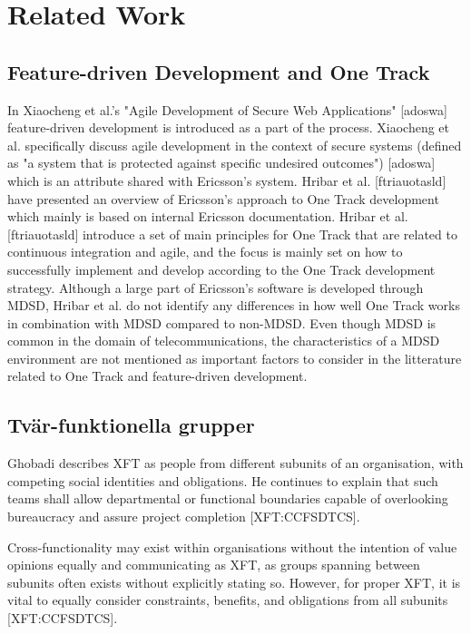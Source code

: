 \documentclass[fina_report_innit.tex]{subfiles}
\begin{document}
\section{Related Work}


\subsection*{Feature-driven Development and One Track}
In Xiaocheng et al.'s "Agile Development of Secure Web Applications" [adoswa] feature-driven development is introduced as a part of the process. Xiaocheng et al. specifically discuss agile development in the context of secure systems (defined as "a system that is protected against specific undesired outcomes") [adoswa] which is an attribute shared with Ericsson's system. Hribar et al. [ftriauotasld] have presented an overview of Ericsson's approach to One Track development which mainly is based on internal Ericsson documentation. Hribar et al. [ftriauotasld] introduce a set of main principles for One Track that are related to continuous integration and agile, and the focus is mainly set on how to successfully implement and develop according to the One Track development strategy. Although a large part of Ericsson's software is developed through MDSD, Hribar et al. do not identify any differences in how well One Track works in combination with MDSD compared to non-MDSD. Even though MDSD is common in the domain of telecommunications, the characteristics of a MDSD environment are not mentioned as important factors to consider in the litterature related to One Track and feature-driven development. 

\subsection*{Tvär-funktionella grupper}
Ghobadi describes XFT as people from different subunits of an organisation, with competing social identities and obligations. He continues to explain that such teams shall allow departmental or functional boundaries capable of overlooking bureaucracy and assure project completion [XFT:CCFSDTCS].

Cross-functionality may exist within organisations without the intention of value opinions equally and communicating as XFT, as groups spanning between subunits often exists without explicitly stating so. However, for proper XFT, it is vital to equally consider constraints, benefits, and obligations from all subunits [XFT:CCFSDTCS].
\end{document}
